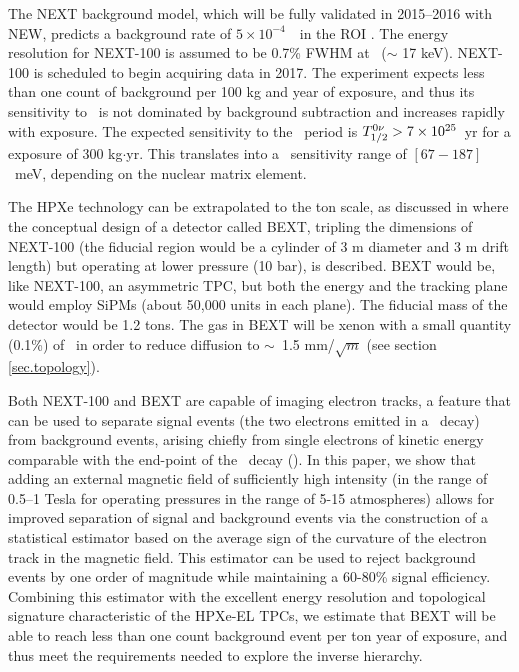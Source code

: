 \documentclass{JINST}
\begin{document}
The NEXT background model, which will be fully validated in 2015--2016 with NEW, predicts a background rate of $5 \times 10^{-4}$~\ckky\ in the ROI \cite{Nebot-Guinot:2014raa}. The energy resolution for NEXT-100 is assumed to be 0.7\% FWHM at \Qbb\ ($\sim$ 17 keV). NEXT-100 is scheduled to begin acquiring data in 2017. The experiment expects less than one count of background per 100 kg and year of exposure, and thus its sensitivity to \Tonu\ is not dominated by background subtraction and increases rapidly with exposure. The expected sensitivity to the \bbonu\ period is $T_{1/2}^{0\nu} > 7 \times 10^{25}$~yr for a exposure of 300 kg$\cdot$yr. This translates into a \mbb\ sensitivity range of $[67-187]$~meV, depending on the nuclear matrix element.

The HPXe technology can be extrapolated to the ton scale, as discussed in \cite{Gomez-Cadenas:2015bext} where the conceptual design of a detector called BEXT, tripling the dimensions of NEXT-100 (the fiducial region would be a cylinder of 3 m diameter and 3 m drift length) but operating at lower pressure (10 bar), is described.  BEXT would be, like NEXT-100, an asymmetric TPC, but both the energy and the tracking plane would employ SiPMs (about 50,000 units in each plane). The fiducial mass of the detector would be 1.2 tons. The gas in BEXT will be xenon with a small quantity (0.1\%) of \COT\ in order to reduce diffusion to $\sim$~1.5 mm/$\sqrt{m}$ (see section \ref{sec.topology}).

Both NEXT-100 and BEXT are capable of imaging electron tracks, a feature that can be used to separate signal events (the two electrons emitted in a \bbonu\ decay) from background events, arising chiefly from single electrons of kinetic energy comparable with the end-point of the \bbonu\ decay (\Qbb). In this paper, we show that adding an external magnetic field of sufficiently high intensity (in the range of 0.5--1 Tesla for operating pressures in the range of 5-15 atmospheres) allows for improved separation of signal and background events via the construction of a statistical estimator based on the average sign of the curvature of the electron track in the magnetic field.  This estimator can be used to reject background events by one order of magnitude while maintaining a 60-80\% signal efficiency. Combining this estimator with the excellent energy resolution and topological signature characteristic of the HPXe-EL TPCs, we estimate that BEXT will be able to reach less than one count background event per ton year of exposure, and thus meet the requirements needed to explore the inverse hierarchy.
\end{document}
